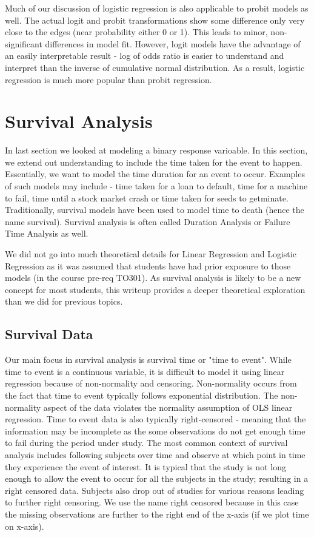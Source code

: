 \documentclass[10pt, letterpaper, twoside]{memoir}\usepackage{knitr}
\newlength\drop
\begin{document}
Much of our discussion of logistic regression is also applicable to probit models as well. The actual logit and probit transformations show some difference only very close to the edges (near probability either 0 or 1). This leads to minor, non-significant differences in model fit.  However, logit models have the advantage of an easily interpretable result - log of odds ratio is easier to understand and interpret than the inverse of cumulative normal distribution. As a result, logistic regression is much more popular than probit regression.  

\section{Survival Analysis}

In last section we looked at modeling a binary response varioable. In this section, we extend out understanding to include the time taken for the event to happen. Essentially, we want to model the time duration for an event to occur. Examples of such models may include - time taken for a loan to default, time for a machine to fail, time until a stock market crash or time taken for seeds to getminate. Traditionally, survival models have been used to model time to death (hence the name survival). Survival analysis is often called Duration Analysis or Failure Time Analysis as well.

We did not go into much theoretical details for Linear Regression and Logistic Regression as it was assumed that students have had prior exposure to those models (in the course pre-req TO301). As survival analysis is likely to be a new concept for most students, this writeup provides a deeper theoretical exploration than we did for previous topics.

\subsection{Survival Data}

Our main focus in survival analysis is survival time or "time to event". While time to event is a continuous variable, it is difficult to model it using linear regression because of non-normality and censoring. Non-normality occurs from the fact that time to event typically follows exponential distribution. The non-normality aspect of the data violates the normality assumption of OLS linear regression.  Time to event data is also typically right-censored - meaning that the information may be incomplete as the some observations do not get enough time to fail during the period under study. The most common context of survival analysis includes following subjects over time and observe at which point in time they experience the event of interest. It is typical that the study is not long enough to allow the event to occur for all the subjects in the study; resulting in a right censored data. Subjects also drop out of studies for various reasons leading to further right censoring. We use the name right censored because in this case the missing observations are further to the right end of the x-axis (if we plot time on x-axis).
\end{document}
